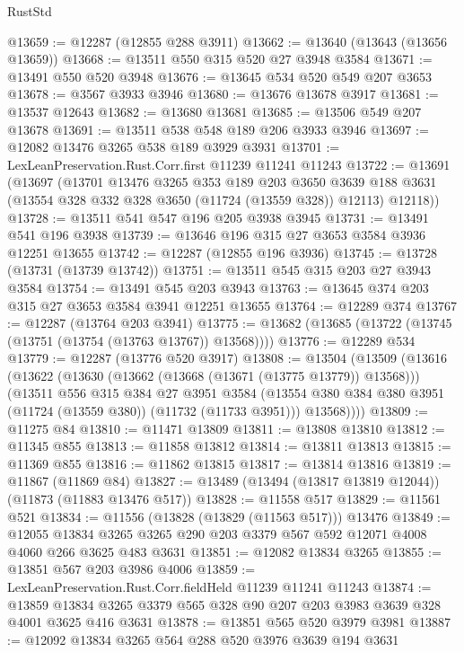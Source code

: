 \begin{lexlean}{RustStd}
\begin{coremodule}
@13659 := @12287 (@12855 @288 @3911)
@13662 := @13640 (@13643 (@13656 @13659))
@13668 := @13511 @550 @315 @520 @27 @3948 @3584
@13671 := @13491 @550 @520 @3948
@13676 := @13645 @534 @520 @549 @207 @3653
@13678 := @3567 @3933 @3946
@13680 := @13676 @13678 @3917
@13681 := @13537 @12643
@13682 := @13680 @13681
@13685 := @13506 @549 @207 @13678
@13691 := @13511 @538 @548 @189 @206 @3933 @3946
@13697 := @12082 @13476 @3265 @538 @189 @3929 @3931
@13701 := LexLeanPreservation.Rust.Corr.first @11239 @11241 @11243
@13722 := @13691
    (@13697
      (@13701
        @13476
        @3265
        @353
        @189
        @203
        @3650
        @3639
        @188
        @3631
        (@13554 @328 @332 @328 @3650 (@11724 (@13559 @328)) @12113)
        @12118))
@13728 := @13511 @541 @547 @196 @205 @3938 @3945
@13731 := @13491 @541 @196 @3938
@13739 := @13646 @196 @315 @27 @3653 @3584 @3936 @12251 @13655
@13742 := @12287 (@12855 @196 @3936)
@13745 := @13728 (@13731 (@13739 @13742))
@13751 := @13511 @545 @315 @203 @27 @3943 @3584
@13754 := @13491 @545 @203 @3943
@13763 := @13645 @374 @203 @315 @27 @3653 @3584 @3941 @12251 @13655
@13764 := @12289 @374
@13767 := @12287 (@13764 @203 @3941)
@13775 := @13682 (@13685 (@13722 (@13745 (@13751 (@13754 (@13763 @13767)) @13568))))
@13776 := @12289 @534
@13779 := @12287 (@13776 @520 @3917)
@13808 := @13504
    (@13509
      (@13616
        (@13622
          (@13630 (@13662 (@13668 (@13671 (@13775 @13779)) @13568)))
          (@13511
            @556
            @315
            @384
            @27
            @3951
            @3584
            (@13554 @380 @384 @380 @3951 (@11724 (@13559 @380)) (@11732 (@11733 @3951)))
            @13568))))
@13809 := @11275 @84
@13810 := @11471 @13809
@13811 := @13808 @13810
@13812 := @11345 @855
@13813 := @11858 @13812
@13814 := @13811 @13813
@13815 := @11369 @855
@13816 := @11862 @13815
@13817 := @13814 @13816
@13819 := @11867 (@11869 @84)
@13827 := @13489 (@13494 (@13817 @13819 @12044)) (@11873 (@11883 @13476 @517))
@13828 := @11558 @517
@13829 := @11561 @521
@13834 := @11556 (@13828 (@13829 (@11563 @517))) @13476
@13849 := @12055
    @13834
    @3265
    @3265
    @290
    @203
    @3379
    @567
    @592
    @12071
    @4008
    @4060
    @266
    @3625
    @483
    @3631
@13851 := @12082 @13834 @3265
@13855 := @13851 @567 @203 @3986 @4006
@13859 := LexLeanPreservation.Rust.Corr.fieldHeld @11239 @11241 @11243
@13874 := @13859 @13834 @3265 @3379 @565 @328 @90 @207 @203 @3983 @3639 @328 @4001 @3625 @416 @3631
@13878 := @13851 @565 @520 @3979 @3981
@13887 := @12092 @13834 @3265 @564 @288 @520 @3976 @3639 @194 @3631

\end{coremodule}
\end{lexlean}
